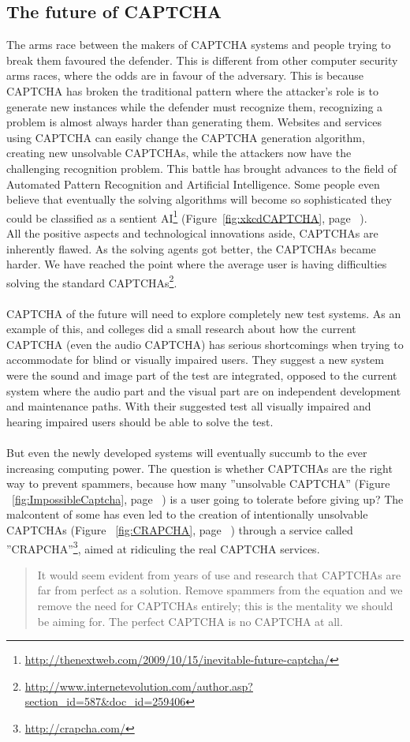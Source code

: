 \documentclass[pdftex,a4paper,12pt,twoside]{report}
\theoremstyle{plain} \newtheorem{theorem}{Theorem} \newtheorem{proposition}{Proposition} \newtheorem{lemma}{Lemma} \newtheorem*{corollary}{Corollary}
\theoremstyle{definition} \newtheorem{definition}{Definition} \newtheorem{conjecture}{Conjecture} \newtheorem*{example}{Example} \newtheorem{algorithm}{Algorithm}
\theoremstyle{remark} \newtheorem*{remark}{Remark} \newtheorem*{note}{Note} \newtheorem{case}{Case}
\begin{document}
\subsection{The future of CAPTCHA}
The arms race between the makers of CAPTCHA systems and people trying to break them favoured the defender. This is different from other computer security arms races, where the odds are in favour of the adversary. This is because CAPTCHA has broken the traditional pattern where the attacker's role is to generate new instances while the defender must recognize them, recognizing a problem is almost always harder than generating them. Websites and services using CAPTCHA can easily change the CAPTCHA generation algorithm, creating new unsolvable CAPTCHAs, while the attackers now have the challenging recognition problem. This battle has brought advances to the field of Automated Pattern Recognition and Artificial Intelligence. Some people even believe that eventually the solving algorithms will become so sophisticated they could be classified as a sentient AI\footnote{\url{http://thenextweb.com/2009/10/15/inevitable-future-captcha/}} (Figure~\ref{fig:xkcdCAPTCHA}, page ~\pageref{fig:xkcdCAPTCHA}).\\
All the positive aspects and technological innovations aside, CAPTCHAs are inherently flawed. As the solving agents got better, the CAPTCHAs became harder. We have reached the point where the average user is having difficulties solving the standard CAPTCHAs\footnote{\url{http://www.internetevolution.com/author.asp?section_id=587&doc_id=259406}}. \\\\CAPTCHA of the future will need to explore completely new test systems. As an example of this, \citep{Sauer2008} and colleges did a small research about how the current CAPTCHA (even the audio CAPTCHA) has serious shortcomings when trying to accommodate for blind or visually impaired users. They suggest a new system were the sound and image part of the test are integrated, opposed to the current system where the audio part and the visual part are on independent development and maintenance paths. With their suggested test all visually impaired and hearing impaired users should be able to solve the test.\\\\
But even the newly developed systems will eventually succumb to the ever increasing computing power. The question is whether CAPTCHAs are the right way to prevent spammers, because how many ''unsolvable CAPTCHA'' (Figure ~\ref{fig:ImpossibleCaptcha}, page ~\pageref{fig:ImpossibleCaptcha}) is a user going to tolerate before giving up? The malcontent of some has even led to the creation of intentionally unsolvable CAPTCHAs (Figure ~\ref{fig:CRAPCHA}, page ~\pageref{fig:CRAPCHA}) through a service called ''CRAPCHA''\footnote{\url{http://crapcha.com/}}, aimed at ridiculing the real CAPTCHA services.
\begin{quote}
It would seem evident from years of use and research that CAPTCHAs are far from perfect as a solution. Remove spammers from the equation and we remove the need for CAPTCHAs entirely; this is the mentality we should be aiming for. The perfect CAPTCHA is no CAPTCHA at all. \citep{Bushell2011}
\end{quote}\newpage
\end{document}
